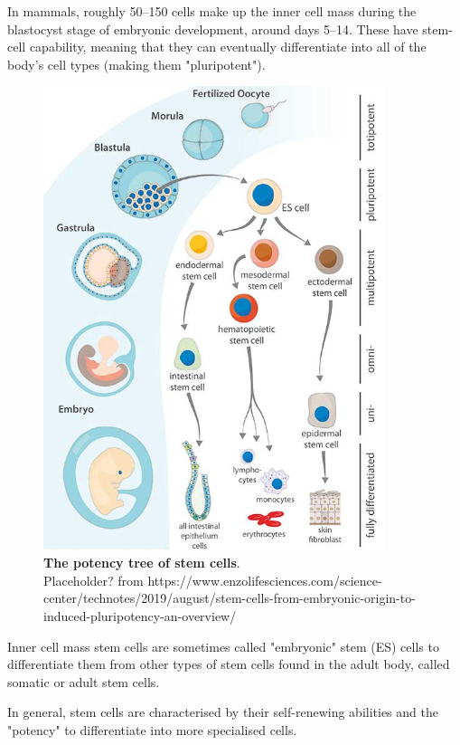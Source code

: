 In mammals, roughly 50–150 cells make up the inner cell mass during the blastocyst stage of embryonic development, around days 5–14. 
These have stem-cell capability, meaning that they can eventually differentiate into all of the body's cell types (making them "pluripotent").

\begin{figure}[h]
\centering
\includegraphics[width=10cm]{Chapter1/Fig/stem_cells.jpg}
\caption[\textbf{Stem Cells}]{\textbf{The potency tree of stem cells}.\\
Placeholder? from https://www.enzolifesciences.com/science-center/technotes/2019/august/stem-cells-from-embryonic-origin-to-induced-pluripotency-an-overview/}
\label{fig:stem_cells}
\end{figure}


Inner cell mass stem cells are sometimes called "embryonic" stem (ES) cells to differentiate them from other types of stem cells found in the adult body, called somatic or adult stem cells.

In general, stem cells are characterised by their self-renewing abilities and the "potency" to differentiate into more specialised cells. 


